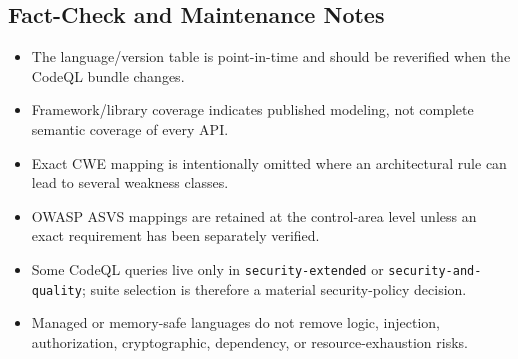 \documentclass[10pt,letterpaper]{article}
\newcommand{\code}[1]{\texttt{\small #1}}
\begin{document}
\subsection{Fact-Check and Maintenance Notes}
\begin{itemize}[leftmargin=*,itemsep=2pt]
  \item The language/version table is point-in-time and should be reverified when the CodeQL bundle changes.
  \item Framework/library coverage indicates published modeling, not complete semantic coverage of every API.
  \item Exact CWE mapping is intentionally omitted where an architectural rule can lead to several weakness classes.
  \item OWASP ASVS mappings are retained at the control-area level unless an exact requirement has been separately verified.
  \item Some CodeQL queries live only in \code{security-extended} or \code{security-and-quality}; suite selection is therefore a material security-policy decision.
  \item Managed or memory-safe languages do not remove logic, injection, authorization, cryptographic, dependency, or resource-exhaustion risks.
\end{itemize}
\clearpage
\end{document}
